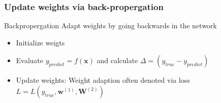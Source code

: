 \documentclass{beamer}
\begin{document}
\begin{frame}
    \frametitle{Update weights via back-propergation}
    \begin{block}{Backpropergation}
        Adapt weights by going backwards in the network
        \begin{itemize}
            \item<1-> Initialize weigts
            \item<2-> Evaluate $y_{predict} = f(\boldsymbol{x})$ and calculate $\Delta = (y_{true} - y_{predict})$
            \item<3-> Update weights: Weight adaption often denoted via loss $L = L(y_{true},\boldsymbol{w}^{(1)},\boldsymbol{W}^{(2)})$
        \end{itemize}
    \end{block} 
    \vspace*{3mm}
    \centering{}
\end{frame}


\end{document}
